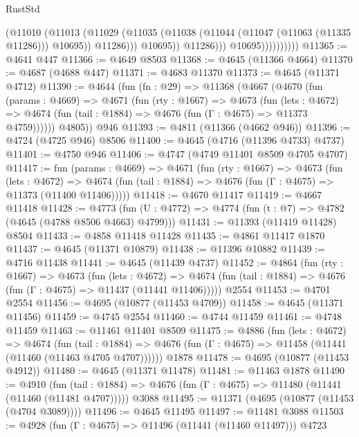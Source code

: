 \begin{lexlean}{RustStd}
\begin{coremodule}
                                (@11010
                                  (@11013
                                    (@11029
                                      (@11035
                                        (@11038 (@11044 (@11047 (@11063 (@11335 @11286))) @10695))
                                        @11286)))
                                  @10695))
                              @11286)))
                        @10695))))))))))
@11365 := @4641 @447
@11366 := @4649 @8503
@11368 := @4645 (@11366 @4664)
@11370 := @4687 (@4688 @447)
@11371 := @4683 @11370
@11373 := @4645 (@11371 @4712)
@11390 := @4644
    (fun (fn : @29) =>
    @11368
      (@4667
        (@4670
          (fun (params : @4669) =>
          @4671
            (fun (rty : @1667) =>
            @4673
              (fun (lets : @4672) =>
              @4674 (fun (tail : @1884) => @4676 (fun (Γ : @4675) => @11373 @4759))))))
        @4805))
    @946
@11393 := @4811 (@11366 (@4662 @946))
@11396 := @4724 (@4725 @946) @8506
@11400 := @4645 (@4716 (@11396 @4733) @4737)
@11401 := @4750 @946
@11406 := @4747 (@4749 @11401 @8509 @4705 @4707)
@11417 := fun (params : @4669) =>
  @4671
    (fun (rty : @1667) =>
    @4673
      (fun (lets : @4672) =>
      @4674 (fun (tail : @1884) => @4676 (fun (Γ : @4675) => @11373 (@11400 @11406)))))
@11418 := @4670 @11417
@11419 := @4667 @11418
@11428 := @4773 (fun (U : @4772) => @4774 (fun (t : @7) => @4782 (@4645 (@4788 @8506 @4663) @4799)))
@11431 := @11393 (@11419 @11428) @8504
@11433 := @4858 @11418 @11428
@11435 := @4861 @11417 @1870
@11437 := @4645 (@11371 @10879)
@11438 := @11396 @10882
@11439 := @4716 @11438
@11441 := @4645 (@11439 @4737)
@11452 := @4864
    (fun (rty : @1667) =>
    @4673
      (fun (lets : @4672) =>
      @4674 (fun (tail : @1884) => @4676 (fun (Γ : @4675) => @11437 (@11441 @11406)))))
    @2554
@11453 := @4701 @2554
@11456 := @4695 (@10877 (@11453 @4709))
@11458 := @4645 (@11371 @11456)
@11459 := @4745 @2554
@11460 := @4744 @11459
@11461 := @4748 @11459
@11463 := @11461 @11401 @8509
@11475 := @4886
    (fun (lets : @4672) =>
    @4674
      (fun (tail : @1884) =>
      @4676 (fun (Γ : @4675) => @11458 (@11441 (@11460 (@11463 @4705 @4707))))))
    @1878
@11478 := @4695 (@10877 (@11453 @4912))
@11480 := @4645 (@11371 @11478)
@11481 := @11463 @1878
@11490 := @4910
    (fun (tail : @1884) => @4676 (fun (Γ : @4675) => @11480 (@11441 (@11460 (@11481 @4707)))))
    @3088
@11495 := @11371 (@4695 (@10877 (@11453 (@4704 @3089))))
@11496 := @4645 @11495
@11497 := @11481 @3088
@11503 := @4928 (fun (Γ : @4675) => @11496 (@11441 (@11460 @11497))) @4723

\end{coremodule}
\end{lexlean}
